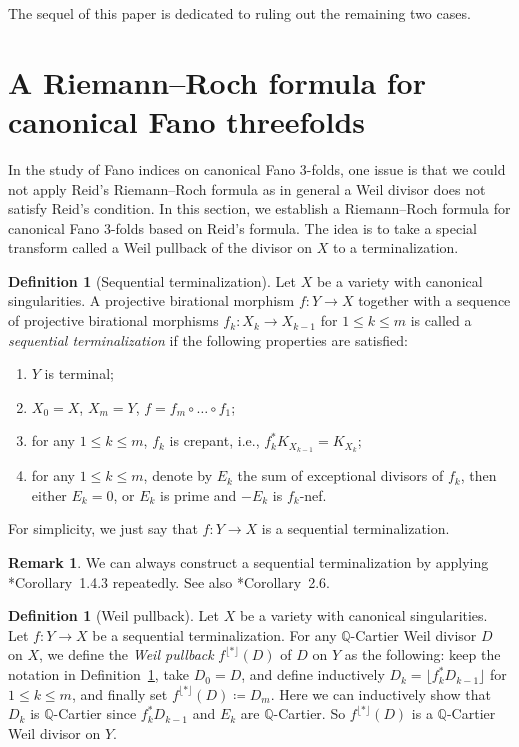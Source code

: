 \documentclass[12pt,twoside]{amsart}
\theoremstyle{definition}
\newtheorem{defn}[thm]{Definition}
\newtheorem{rem}[thm]{Remark}
\begin{document}
The sequel of this paper is dedicated to ruling out the remaining two cases.

\section{A Riemann--Roch formula for canonical Fano threefolds}\label{sec.rr}

In the study of Fano indices on canonical Fano $3$-folds, one issue is that we could not apply Reid's Riemann--Roch formula as in general a Weil divisor does not satisfy Reid's condition. In this section, we establish a Riemann--Roch formula for canonical Fano $3$-folds based on Reid's formula. The idea is to take a special transform called a Weil pullback of the divisor on $X$ to a terminalization. 

\begin{defn}[Sequential terminalization]\label{def seq terminalization}
    Let $X$ be a variety with canonical singularities. A projective birational morphism $f\colon Y\to X$ together with a sequence of projective birational morphisms $f_k\colon X_k\to X_{k-1}$ for $1\leq k\leq m$ is called a {\it sequential terminalization} if the following properties are satisfied: 
    \begin{enumerate}
        \item $Y$ is terminal;
        \item $X_0=X$, $X_m=Y$, $f=f_m\circ \dots \circ f_1$; %
        \item for any $1\leq k\leq m$, $f_k$ is crepant, i.e., $f_k^*K_{X_{k-1}}=K_{X_k}$;
        \item for any $1\leq k\leq m$, denote by $E_k$ the sum of exceptional divisors of $f_k$, then either $E_k=0$, or $E_k$ is prime and $-E_k$ is $f_k$-nef.
    \end{enumerate} 
    For simplicity, we just say that $f\colon Y\to X$ is a sequential terminalization. 
\end{defn}

\begin{rem}
    We can always construct a sequential terminalization by applying \cite{BCHM}*{Corollary~1.4.3} repeatedly. See also \cite{kawakita}*{Corollary~2.6}.
\end{rem}

\begin{defn}[Weil pullback]
    Let $X$ be a variety with canonical singularities. Let $f\colon Y\to X$ be a sequential terminalization. For any $\mathbb{Q}$-Cartier Weil divisor $D$ on $X$, we define the {\it Weil pullback} $f^{\lfloor *\rfloor}(D)$ of $D$ on $Y$ as the following: keep the notation in Definition~\ref{def seq terminalization}, take $D_0=D$, and define inductively $D_k=\lfloor f_k^*D_{k-1} \rfloor$ for $1\leq k\leq m$, and finally set $f^{\lfloor *\rfloor}(D)\coloneq D_m$. Here we can inductively show that $D_k$ is $\mathbb{Q}$-Cartier since $f_k^*D_{k-1}$ and $E_k$ are $\mathbb{Q}$-Cartier. So $f^{\lfloor *\rfloor}(D)$ is a $\mathbb{Q}$-Cartier Weil divisor on $Y$. 
\end{defn}
\end{document}
